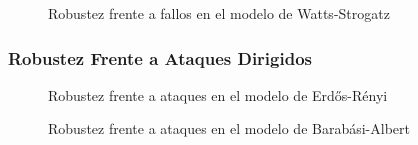 \begin{figure}[h]
    \caption{Robustez frente a fallos en el modelo de Watts-Strogatz}
\end{figure}

\newpage
\subsubsection{Robustez Frente a Ataques Dirigidos}

\begin{figure}[h]
    \caption{Robustez frente a ataques en el modelo de Erdős-Rényi}
\end{figure}

\begin{figure}[h]
    \caption{Robustez frente a ataques en el modelo de Barabási-Albert}
\end{figure}

